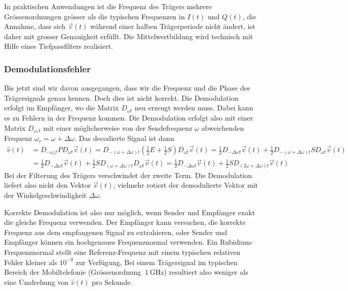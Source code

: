 In praktischen Anwendungen ist die Frequenz des Trägers mehrere
Grössenordnungen grösser als die typischen Frequenzen in $I(t)$ 
und $Q(t)$, die Annahme, dass sich $\vec{v}(t)$ während einer halben
Trägerperiode nicht ändert, ist daher mit grosser Genauigkeit erfüllt.
Die Mittelwertbildung wird technisch mit Hilfe eines Tiefpassfilters
realisiert.

\subsubsection{Demodulationsfehler}
Bis jetzt sind wir davon ausgegangen, dass wir die Frequenz und die
Phase des Trägersignals genau kennen.
Doch dies ist nicht korrekt.
Die Demodulation erfolgt im Empfänger, wo die Matrix $D_{\omega t}$
neu erzeugt werden muss.
Dabei kann es zu Fehlern in der Frequenz kommen.
Die Demodulation erfolgt also mit einer Matrix $D_{\omega_rt}$
mit einer möglicherweise von der Sendefrequenz $\omega$
abweichenden Frequenz $\omega_r=\omega+\Delta\omega$.
Das decodierte Signal ist dann
\begin{equation}
\begin{aligned}
\hat{v}(t)
&=
D_{-\omega_rt}PD_{\omega t}\vec{v}(t)
=
D_{-(\omega+\Delta\omega)t} ({\textstyle\frac12}E+{\textstyle\frac12}S)
D_{\omega t}\vec{v}(t)
=
\frac12D_{-\Delta\omega t}\vec{v}(t)
+
\frac12D_{-(\omega+\Delta\omega)t}SD_{\omega t}\vec{v}(t)
\\
&=
\frac12 D_{-\Delta\omega t}\vec{v}(t)
+
\frac12 SD_{(\omega +\Delta\omega) t}D_{\omega t}\vec{v}(t)
=
\frac12 D_{-\Delta\omega t}\vec{v}(t)
+
\frac12 SD_{(2\omega +\Delta\omega) t}\vec{v}(t)
\end{aligned}
\label{eqn:qam:demoomegar}
\end{equation}
Bei der Filterung des Trägers verschwindet der zweite Term.
Die Demodulation liefert also nicht den Vektor $\vec{v}(t)$, vielmehr
rotiert der demodulierte Vektor mit der Winkelgeschwindigkeit $\Delta\omega$.

Korrekte Demodulation ist also nur möglich, wenn Sender und Empfänger exakt
die gleiche Frequenz verwenden.
Der Empfänger kann versuchen, die korrekte Frequenz aus dem empfangenen
Signal zu extrahieren, oder Sender und Empfänger können ein hochgenaues
Frequenznormal verwenden.
Ein Rubidium-Frequenznormal stellt eine Referenz-Frequenz mit einem
typischen relativen Fehler kleiner als $10^{-9}$ zur Verfügung,
Bei einem Trägersignal im typischen Bereich der Mobiltelefonie (Grössenordnung
$~1\,\text{GHz}$) resultiert also weniger als eine Umdrehung von $\hat{v}(t)$
pro Sekunde.

